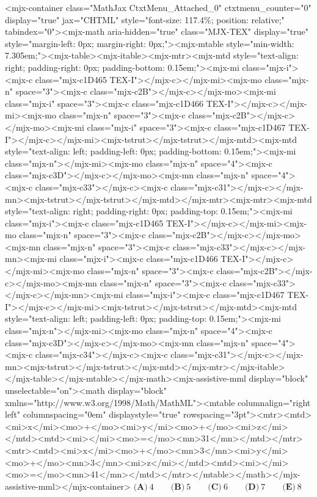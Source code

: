 \begin{enumerate}
<mjx-container class="MathJax CtxtMenu\_Attached\_0" ctxtmenu\_counter="0" display="true" jax="CHTML" style="font-size: 117.4\%; position: relative;" tabindex="0"><mjx-math aria-hidden="true" class="MJX-TEX" display="true" style="margin-left: 0px; margin-right: 0px;"><mjx-mtable style="min-width: 7.305em;"><mjx-table><mjx-itable><mjx-mtr><mjx-mtd style="text-align: right; padding-right: 0px; padding-bottom: 0.15em;"><mjx-mi class="mjx-i"><mjx-c class="mjx-c1D465 TEX-I"></mjx-c></mjx-mi><mjx-mo class="mjx-n" space="3"><mjx-c class="mjx-c2B"></mjx-c></mjx-mo><mjx-mi class="mjx-i" space="3"><mjx-c class="mjx-c1D466 TEX-I"></mjx-c></mjx-mi><mjx-mo class="mjx-n" space="3"><mjx-c class="mjx-c2B"></mjx-c></mjx-mo><mjx-mi class="mjx-i" space="3"><mjx-c class="mjx-c1D467 TEX-I"></mjx-c></mjx-mi><mjx-tstrut></mjx-tstrut></mjx-mtd><mjx-mtd style="text-align: left; padding-left: 0px; padding-bottom: 0.15em;"><mjx-mi class="mjx-n"></mjx-mi><mjx-mo class="mjx-n" space="4"><mjx-c class="mjx-c3D"></mjx-c></mjx-mo><mjx-mn class="mjx-n" space="4"><mjx-c class="mjx-c33"></mjx-c><mjx-c class="mjx-c31"></mjx-c></mjx-mn><mjx-tstrut></mjx-tstrut></mjx-mtd></mjx-mtr><mjx-mtr><mjx-mtd style="text-align: right; padding-right: 0px; padding-top: 0.15em;"><mjx-mi class="mjx-i"><mjx-c class="mjx-c1D465 TEX-I"></mjx-c></mjx-mi><mjx-mo class="mjx-n" space="3"><mjx-c class="mjx-c2B"></mjx-c></mjx-mo><mjx-mn class="mjx-n" space="3"><mjx-c class="mjx-c33"></mjx-c></mjx-mn><mjx-mi class="mjx-i"><mjx-c class="mjx-c1D466 TEX-I"></mjx-c></mjx-mi><mjx-mo class="mjx-n" space="3"><mjx-c class="mjx-c2B"></mjx-c></mjx-mo><mjx-mn class="mjx-n" space="3"><mjx-c class="mjx-c33"></mjx-c></mjx-mn><mjx-mi class="mjx-i"><mjx-c class="mjx-c1D467 TEX-I"></mjx-c></mjx-mi><mjx-tstrut></mjx-tstrut></mjx-mtd><mjx-mtd style="text-align: left; padding-left: 0px; padding-top: 0.15em;"><mjx-mi class="mjx-n"></mjx-mi><mjx-mo class="mjx-n" space="4"><mjx-c class="mjx-c3D"></mjx-c></mjx-mo><mjx-mn class="mjx-n" space="4"><mjx-c class="mjx-c34"></mjx-c><mjx-c class="mjx-c31"></mjx-c></mjx-mn><mjx-tstrut></mjx-tstrut></mjx-mtd></mjx-mtr></mjx-itable></mjx-table></mjx-mtable></mjx-math><mjx-assistive-mml display="block" unselectable="on"><math display="block" xmlns="http://www.w3.org/1998/Math/MathML"><mtable columnalign="right left" columnspacing="0em" displaystyle="true" rowspacing="3pt"><mtr><mtd><mi>x</mi><mo>+</mo><mi>y</mi><mo>+</mo><mi>z</mi></mtd><mtd><mi></mi><mo>=</mo><mn>31</mn></mtd></mtr><mtr><mtd><mi>x</mi><mo>+</mo><mn>3</mn><mi>y</mi><mo>+</mo><mn>3</mn><mi>z</mi></mtd><mtd><mi></mi><mo>=</mo><mn>41</mn></mtd></mtr></mtable></math></mjx-assistive-mml></mjx-container>
$\textbf{(A)}\   4  \qquad 	\textbf{(B)}\   5  \qquad 	\textbf{(C)}\   6  \qquad 	\textbf{(D)}\   7  \qquad 	\textbf{(E)}\   8$


\end{enumerate}
